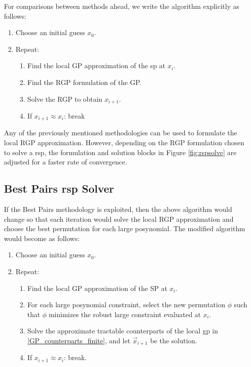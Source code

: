 For comparisons between methods ahead, we write the algorithm explicitly as follows:

\begin{enumerate}
    \item Choose an initial guess $x_0$.
    \item Repeat:
    \begin{enumerate}
        \item Find the local GP approximation of the \gls{sp} at $x_i$.
        \item Find the RGP formulation of the GP.
        \item Solve the RGP to obtain $x_{i+1}$.
        \item If $x_{i+1} \approx x_{i}$: break
    \end{enumerate}
\end{enumerate}

Any of the previously mentioned methodologies can be used to formulate the local RGP approximation. 
However, depending on the RGP formulation chosen to solve a \gls{rsp}, the formulation and solution
blocks in Figure \ref{fig:rspsolve} are adjusted for a faster rate of convergence.

\subsection{Best Pairs \gls{rsp} Solver}

If the Best Pairs methodology is exploited, then the above algorithm would change so that
each iteration would solve the local RGP approximation and choose the best permutation
for each large posynomial. The modified algorithm would become as follows:

\begin{enumerate}
    \item Choose an initial guess $x_0$.
    \item Repeat:
    \begin{enumerate}
        \item Find the local GP approximation of the SP at $x_i$.
        \item For each large posynomial constraint, select the new permutation $\phi$
                such that $\phi$ minimizes the robust large constraint evaluated at $x_i$.
        \item Solve the approximate tractable counterparts of the local \gls{gp} in
                \eqref{GP_counterparts_finite}, and let $\vec{x}_{i+1}$ be the solution.
        \item If $x_{i+1} \approx x_{i}$: break.
    \end{enumerate}
\end{enumerate}


